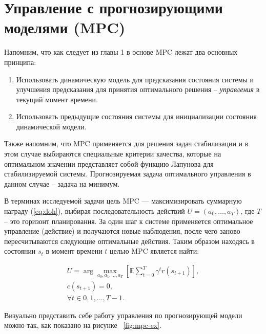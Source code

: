 \section{Управление с прогнозирующими моделями (MPC)}\label{1sec:optimal-control}


Напомним, что как следует из главы 1 в основе MPC лежат два основных принципа:
\begin{enumerate}
	\item Использовать динамическую модель для предсказания состояния системы и улучшения предсказания для принятия оптимального решения -- \textit{управления} в текущий момент времени.
	
	\item Использовать предыдущие состояния системы для инициализации состояния динамической модели.
\end{enumerate}

Также напомним, что MPC применяется для решения задач стабилизации и в этом случае выбираются специальные критерии качества, которые на оптимальном значении представляет собой функцию Лапунова для стабилизируемой системы. Прогнозируемая задача оптимального управления в данном случае -- задача на минимум.

В терминах исследуемой задачи цель MPC — максимизировать суммарную награду (\ref{eq:doh}), выбирая последовательность действий $U=(a_0, \dots, a_T)$, где $T$ -- это горизонт планирования. За один шаг к системе применяется оптимальное управление (действие) и  получаются новые наблюдения, после чего заново пересчитываются следующие оптимальные действия. Таким образом находясь в состоянии $s_t$ в момент времени $t$ целью MPC является найти:

\begin{equation}
	\begin{split}
	U = \arg \max_{a_0, a_1, \dots, a_T} [ \mathbb{E}  \sum \limits_{t=0}^{T} \gamma^t r(s_{t+1})] , \\
	c(s_{t+1}) = 0, \\
	\forall t \in {0, 1, \dots, T-1}. 
	\label{eq:U}
	\end{split}
\end{equation}


Визуально представить себе работу управления по прогнозирующей модели можно так, как показано на рисунке ~\ref{fig:mpc-ex}. \newpage

